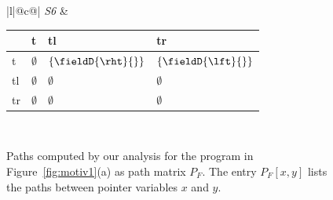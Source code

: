 \begin{figure}[t]
\begin{center}
{\begin{tabular}[b]{|l|@{}c@{}|}
      {\em \scriptsize S6} &				
      \begin{tabular}{|p{3mm}||p{6mm}|p{12mm}|p{22mm}|} \hline
        &  t         & tl        & tr   \\ \hline\hline
  	t  	& $\emptyset$   & ${\tt \{\fieldD{\rht}{}\}}$   & ${\tt \{\fieldD{\lft}{} \}}$ \\ \hline
  	tl  & $\emptyset$   & $\emptyset$   & $\emptyset$   \\ \hline
  	tr  & $\emptyset$   & $\emptyset$   & $\emptyset$   \\ \hline
      \end{tabular} \\ \hline
    \end{tabular}				
  }
\end{center}
\caption{\label{fig:motiv2}  Paths computed  by  our analysis
  for  the  program  in  Figure~\ref{fig:motiv1}(a)  as  path
  matrix $P_F$.   The entry $P_F[x,y]$  lists  the  paths   between  pointer
  variables $x$ and $y$.}
\end{figure}

